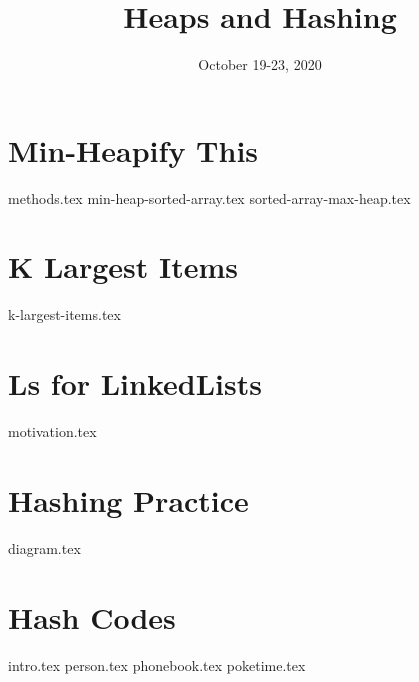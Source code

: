 \documentclass[11pt]{exam}
\title{Heaps and Hashing}
\date{October 19-23, 2020}
\begin{document}
\maketitle

\section{Min-Heapify This}
\begin{questions}
{methods.tex}
{min-heap-sorted-array.tex}
{sorted-array-max-heap.tex}
\end{questions}

\section{K Largest Items}
\begin{questions}
{k-largest-items.tex}
\end{questions}

\section{Ls for LinkedLists}
\begin{questions}
{motivation.tex}
\end{questions}
\newpage
\section{Hashing Practice}
\begin{questions}
{diagram.tex}
\end{questions}
\newpage
\section{Hash Codes}
\begin{questions}
{intro.tex}
{person.tex}
{phonebook.tex}
{poketime.tex}
\end{questions}
\end{document}
